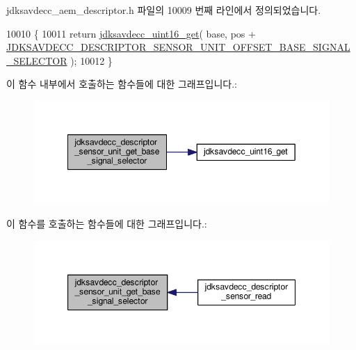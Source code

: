 jdksavdecc\+\_\+aem\+\_\+descriptor.\+h 파일의 10009 번째 라인에서 정의되었습니다.


\begin{DoxyCode}
10010 \{
10011     \textcolor{keywordflow}{return} \hyperlink{group__endian_ga3fbbbc20be954aa61e039872965b0dc9}{jdksavdecc\_uint16\_get}( base, pos + 
      \hyperlink{group__descriptor__sensor_ga8050e1528bdea79b2151a88e223e80dd}{JDKSAVDECC\_DESCRIPTOR\_SENSOR\_UNIT\_OFFSET\_BASE\_SIGNAL\_SELECTOR}
       );
10012 \}
\end{DoxyCode}


이 함수 내부에서 호출하는 함수들에 대한 그래프입니다.\+:
\nopagebreak
\begin{figure}[H]
\begin{center}
\leavevmode
\includegraphics[width=349pt]{group__descriptor__sensor_ga6cceb73a85c154792b0a8d78aa4eb66e_cgraph}
\end{center}
\end{figure}




이 함수를 호출하는 함수들에 대한 그래프입니다.\+:
\nopagebreak
\begin{figure}[H]
\begin{center}
\leavevmode
\includegraphics[width=347pt]{group__descriptor__sensor_ga6cceb73a85c154792b0a8d78aa4eb66e_icgraph}
\end{center}
\end{figure}


